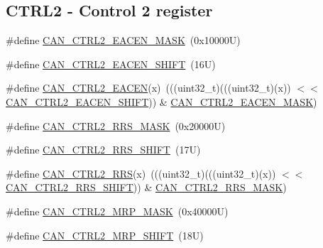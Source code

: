 \subsection*{C\+T\+R\+L2 -\/ Control 2 register}
\begin{DoxyCompactItemize}
\item 
\#define \mbox{\hyperlink{group___c_a_n___register___masks_gacf49e8d44f1f8993cda6e29a36c7a90f}{C\+A\+N\+\_\+\+C\+T\+R\+L2\+\_\+\+E\+A\+C\+E\+N\+\_\+\+M\+A\+SK}}~(0x10000\+U)
\item 
\#define \mbox{\hyperlink{group___c_a_n___register___masks_gae0e425b33b8b975d6a33b8e090e040e8}{C\+A\+N\+\_\+\+C\+T\+R\+L2\+\_\+\+E\+A\+C\+E\+N\+\_\+\+S\+H\+I\+FT}}~(16\+U)
\item 
\#define \mbox{\hyperlink{group___c_a_n___register___masks_ga2b2bdb7ef61b03e9febd95f5b9638ae1}{C\+A\+N\+\_\+\+C\+T\+R\+L2\+\_\+\+E\+A\+C\+EN}}(x)~(((uint32\+\_\+t)(((uint32\+\_\+t)(x)) $<$$<$ \mbox{\hyperlink{group___c_a_n___register___masks_gae0e425b33b8b975d6a33b8e090e040e8}{C\+A\+N\+\_\+\+C\+T\+R\+L2\+\_\+\+E\+A\+C\+E\+N\+\_\+\+S\+H\+I\+FT}})) \& \mbox{\hyperlink{group___c_a_n___register___masks_gacf49e8d44f1f8993cda6e29a36c7a90f}{C\+A\+N\+\_\+\+C\+T\+R\+L2\+\_\+\+E\+A\+C\+E\+N\+\_\+\+M\+A\+SK}})
\item 
\#define \mbox{\hyperlink{group___c_a_n___register___masks_ga5776a65b75ea42afc810081a66d4e1b4}{C\+A\+N\+\_\+\+C\+T\+R\+L2\+\_\+\+R\+R\+S\+\_\+\+M\+A\+SK}}~(0x20000\+U)
\item 
\#define \mbox{\hyperlink{group___c_a_n___register___masks_ga143cc0bdd4c88978ccbe42849d3fc038}{C\+A\+N\+\_\+\+C\+T\+R\+L2\+\_\+\+R\+R\+S\+\_\+\+S\+H\+I\+FT}}~(17\+U)
\item 
\#define \mbox{\hyperlink{group___c_a_n___register___masks_gad6e1c431bf64441d368e11c06dc070a6}{C\+A\+N\+\_\+\+C\+T\+R\+L2\+\_\+\+R\+RS}}(x)~(((uint32\+\_\+t)(((uint32\+\_\+t)(x)) $<$$<$ \mbox{\hyperlink{group___c_a_n___register___masks_ga143cc0bdd4c88978ccbe42849d3fc038}{C\+A\+N\+\_\+\+C\+T\+R\+L2\+\_\+\+R\+R\+S\+\_\+\+S\+H\+I\+FT}})) \& \mbox{\hyperlink{group___c_a_n___register___masks_ga5776a65b75ea42afc810081a66d4e1b4}{C\+A\+N\+\_\+\+C\+T\+R\+L2\+\_\+\+R\+R\+S\+\_\+\+M\+A\+SK}})
\item 
\#define \mbox{\hyperlink{group___c_a_n___register___masks_ga7f07676c379363d679cfcb6c362e1cc6}{C\+A\+N\+\_\+\+C\+T\+R\+L2\+\_\+\+M\+R\+P\+\_\+\+M\+A\+SK}}~(0x40000\+U)
\item 
\#define \mbox{\hyperlink{group___c_a_n___register___masks_ga868c342244c921f9824c4d0c172f4081}{C\+A\+N\+\_\+\+C\+T\+R\+L2\+\_\+\+M\+R\+P\+\_\+\+S\+H\+I\+FT}}~(18\+U)

\end{DoxyCompactItemize}
